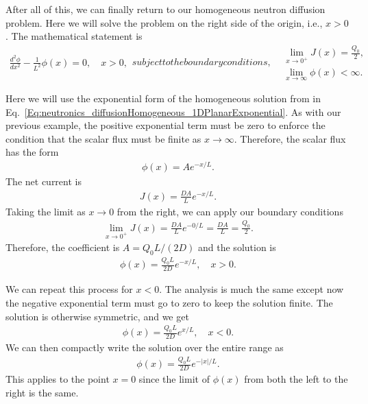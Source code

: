 After all of this, we can finally return to our homogeneous neutron diffusion problem. Here we will solve the problem on the right side of the origin, i.e., $x > 0$. The mathematical statement is
\begin{subequations}
\begin{align}
  \frac{d^2 \phi}{dx^2} - \frac{1}{L^2} \phi(x) = 0, \quad x > 0,
\end{align}
subject to the boundary conditions,
\begin{align}
  &\lim_{x \rightarrow 0^+} 		J(x) = \frac{Q_0}{2}, \\
  &\lim_{x \rightarrow \infty}	 \phi(x) < \infty.
\end{align}
\end{subequations}

Here we will use the exponential form of the homogeneous solution from in Eq.~\eqref{Eq:neutronics_diffusionHomogeneous_1DPlanarExponential}. As with our previous example, the positive exponential term must be zero to enforce the condition that the scalar flux must be finite as $x \rightarrow \infty$. Therefore, the scalar flux has the form
\begin{align}
  \phi(x) = A e^{-x/L} .
\end{align}
The net current is
\begin{align}
  J(x) = \frac{D A}{L} e^{-x/L}.
\end{align}
Taking the limit as $x \rightarrow 0$ from the right, we can apply our boundary conditions
\begin{align}
  \lim_{x \rightarrow 0^+} J(x) = \frac{D A}{L} e^{-0/L} = \frac{D A}{L} = \frac{ Q_0 }{ 2 }.
\end{align}
Therefore, the coefficient is $ A = Q_0 L / ( 2 D )$ and the solution is
\begin{align}
  \phi(x) = \frac{ Q_0 L }{ 2 D } e^{-x/L} , \quad x > 0.
\end{align}

We can repeat this process for $x < 0$. The analysis is much the same except now the negative exponential term must go to zero to keep the solution finite. The solution is otherwise symmetric, and we get
\begin{align}
  \phi(x) = \frac{ Q_0 L }{ 2 D } e^{x/L} , \quad x < 0.
\end{align}
We can then compactly write the solution over the entire range as
\begin{align} \label{Eq:neutronics_diffusionScalarFlux_PlanarSource}
  \phi(x) = \frac{ Q_0 L }{ 2 D } e^{-|x|/L} .
\end{align}
This applies to the point $x = 0$ since the limit of $\phi(x)$ from both the left to the right is the same.

